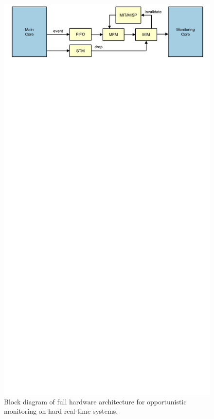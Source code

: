 \begin{figure}
  \begin{center}
    \includegraphics{monitoring_hard_drop/figs/full_hw.pdf}
    \caption{Block diagram of full hardware architecture for opportunistic
    monitoring on hard real-time systems.}
    \label{fig:monitoring_hard_drop.hwdrop.full_hw}
  \end{center}
\end{figure}

